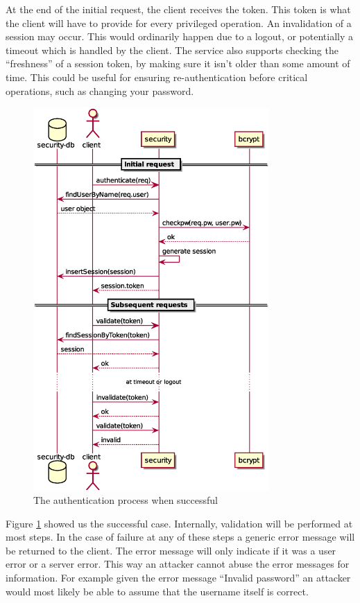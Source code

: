 At the end of the initial request, the client receives the token. This token is
what the client will have to provide for every privileged operation.  An
invalidation of a session may occur. This would ordinarily happen due to a
logout, or potentially a timeout which is handled by the client. The \security
service also supports checking the ``freshness'' of a session token, by making
sure it isn't older than some amount of time. This could be useful for ensuring
re-authentication before critical operations, such as changing your password.

\begin{figure}
    \begin{center}
    \includegraphics[width=0.8\textwidth]{package_manager/auth_sequence.eps}
    \end{center}
    \caption{The authentication process when successful}
    \label{fig:auth_process}
\end{figure}

Figure \ref{fig:auth_process} showed us the successful case. Internally,
validation will be performed at most steps. In the case of failure at
any of these steps a generic error message will be returned to the
client. The error message will only indicate if it was a user error or a
server error. This way an attacker cannot abuse the error messages for
information. For example given the error message ``Invalid password'' an
attacker would most likely be able to assume that the username itself is
correct.

